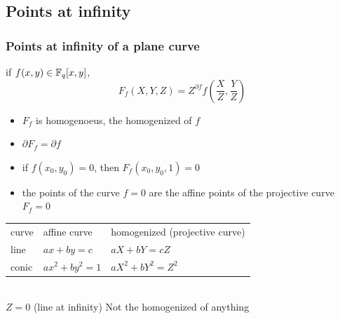 \documentclass[10pt,handout]{beamer} %
\begin{document}
\subsection{Points at infinity}
\begin{frame}
\frametitle{Points at infinity of a plane curve}

\begin{Definition}
if $f(x,y)\in\mathbb F_q[x,y]$,
$$F_f(X,Y,Z)=Z^{\partial f}f(\frac{X}{Z},\frac{Y}{Z})$$ \vspace*{-2pt}\pause
\begin{itemize}[<+-| alert@+>]
 \item $F_f$ is homogenoeus, \alert{the homogenized of $f$}
 \item $\partial F_f=\partial f$
\item if $f(x_0,y_0)=0$, then $F_f(x_0,y_0,1)=0$
\item the points of the curve $f=0$ are the affine points of
the projective curve $F_f=0$
\end{itemize}
\end{Definition}\pause

\begin{example}\pause
\begin{tabular}{|l|l|l|}
\hline
 curve & affine curve & homogenized (projective curve) \\
line & $ax+by=c$ & $aX+bY=cZ$\\
conic & $ax^2+by^2=1$& $aX^2+bY^2=Z^2$\\
\hline
\end{tabular}\\ \pause
$Z=0$ (line at infinity)\hfill \pause
Not the homogenized of anything
\end{example}
\end{frame}
\end{document}
